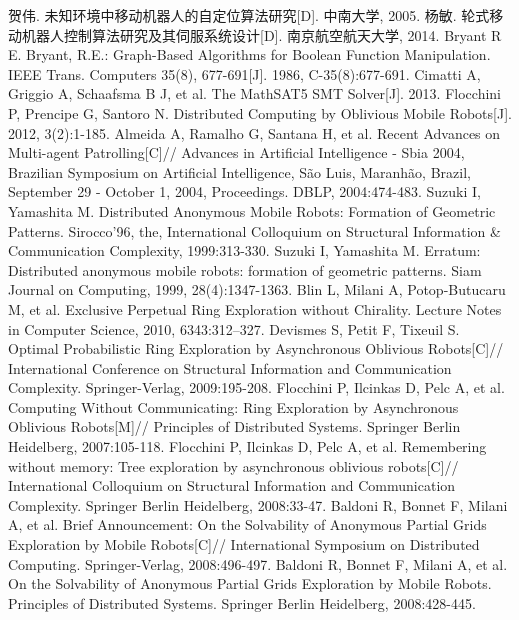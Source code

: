 \begin{thebibliography}{0}
   贺伟. 未知环境中移动机器人的自定位算法研究[D]. 中南大学, 2005.
   杨敏. 轮式移动机器人控制算法研究及其伺服系统设计[D]. 南京航空航天大学, 2014.
   Bryant R E. Bryant, R.E.: Graph-Based Algorithms for Boolean Function Manipulation. IEEE Trans. Computers 35(8), 677-691[J]. 1986, C-35(8):677-691.
   Cimatti A, Griggio A, Schaafsma B J, et al. The MathSAT5 SMT Solver[J]. 2013.
   Flocchini P, Prencipe G, Santoro N. Distributed Computing by Oblivious Mobile Robots[J]. 2012, 3(2):1-185.  
   Almeida A, Ramalho G, Santana H, et al. Recent Advances on Multi-agent Patrolling[C]// Advances in Artificial Intelligence - Sbia 2004, Brazilian Symposium on Artificial Intelligence, São Luis, Maranhão, Brazil, September 29 - October 1, 2004, Proceedings. DBLP, 2004:474-483.
   Suzuki I, Yamashita M. Distributed Anonymous Mobile Robots: Formation of Geometric Patterns. Sirocco'96, the, International Colloquium on Structural Information & Communication Complexity, 1999:313-330.
   Suzuki I, Yamashita M. Erratum: Distributed anonymous mobile robots: formation of geometric patterns. Siam Journal on Computing, 1999, 28(4):1347-1363.
   Blin L, Milani A, Potop-Butucaru M, et al. Exclusive Perpetual Ring Exploration without Chirality. Lecture Notes in Computer Science, 2010, 6343:312--327.
   Devismes S, Petit F, Tixeuil S. Optimal Probabilistic Ring Exploration by Asynchronous Oblivious Robots[C]// International Conference on Structural Information and Communication Complexity. Springer-Verlag, 2009:195-208.
   Flocchini P, Ilcinkas D, Pelc A, et al. Computing Without Communicating: Ring Exploration by Asynchronous Oblivious Robots[M]// Principles of Distributed Systems. Springer Berlin Heidelberg, 2007:105-118.
   Flocchini P, Ilcinkas D, Pelc A, et al. Remembering without memory: Tree exploration by asynchronous oblivious robots[C]// International Colloquium on Structural Information and Communication Complexity. Springer Berlin Heidelberg, 2008:33-47.
   Baldoni R, Bonnet F, Milani A, et al. Brief Announcement: On the Solvability of Anonymous Partial Grids Exploration by Mobile Robots[C]// International Symposium on Distributed Computing. Springer-Verlag, 2008:496-497.
   Baldoni R, Bonnet F, Milani A, et al. On the Solvability of Anonymous Partial Grids Exploration by Mobile Robots. Principles of Distributed Systems. Springer Berlin Heidelberg, 2008:428-445.

\end{thebibliography}
